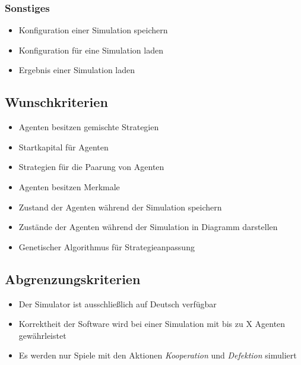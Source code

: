\subsubsection{Sonstiges}
\begin{itemize}
\item Konfiguration einer Simulation speichern
\item Konfiguration für eine Simulation laden
\item Ergebnis einer Simulation laden
\end{itemize}

\subsection{Wunschkriterien}
\begin{itemize}
\item Agenten besitzen gemischte Strategien
\item Startkapital für Agenten
\item Strategien für die Paarung von Agenten
\item Agenten besitzen Merkmale
\item Zustand der Agenten während der Simulation speichern
\item Zustände der Agenten während der Simulation in Diagramm darstellen
\item Genetischer Algorithmus für Strategieanpassung
\end{itemize}

\subsection{Abgrenzungskriterien}
\begin{itemize}
\item Der Simulator ist ausschließlich auf Deutsch verfügbar
\item Korrektheit der Software wird bei einer Simulation mit bis zu X Agenten gewährleistet
\item Es werden nur Spiele mit den Aktionen \emph{Kooperation} und \emph{Defektion} simuliert 
\end{itemize}